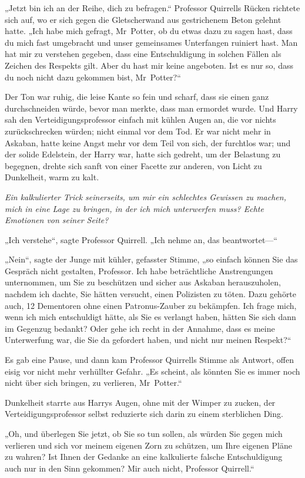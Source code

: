 {„Jetzt bin ich an der Reihe, dich zu befragen.“ Professor Quirrells Rücken richtete sich auf, wo er sich gegen die Gletscherwand aus gestrichenem Beton gelehnt hatte. „Ich habe mich gefragt, Mr~Potter, ob du etwas dazu zu sagen hast, dass du mich fast umgebracht und unser gemeinsames Unterfangen ruiniert hast. Man hat mir zu verstehen gegeben, dass eine Entschuldigung in solchen Fällen als Zeichen des Respekts gilt. Aber du hast mir keine angeboten. Ist es nur so, dass du noch nicht dazu gekommen bist, Mr~Potter?“

Der Ton war ruhig, die leise Kante so fein und scharf, dass sie einen ganz durchschneiden würde, bevor man merkte, dass man ermordet wurde. Und Harry sah den Verteidigungsprofessor einfach mit kühlen Augen an, die vor nichts zurückschrecken würden; nicht einmal vor dem Tod. Er war nicht mehr in Askaban, hatte keine Angst mehr vor dem Teil von sich, der furchtlos war; und der solide Edelstein, der Harry war, hatte sich gedreht, um der Belastung zu begegnen, drehte sich sanft von einer Facette zur anderen, von Licht zu Dunkelheit, warm zu kalt.

\emph{Ein kalkulierter Trick seinerseits, um mir ein schlechtes Gewissen zu machen, mich in eine Lage zu bringen, in der ich mich unterwerfen muss? Echte Emotionen von seiner Seite?}

„Ich verstehe“, sagte Professor Quirrell. „Ich nehme an, das beantwortet—“

„Nein“, sagte der Junge mit kühler, gefasster Stimme, „so einfach können Sie das Gespräch nicht gestalten, Professor. Ich habe beträchtliche Anstrengungen unternommen, um Sie zu beschützen und sicher aus Askaban herauszuholen, nachdem ich dachte, Sie hätten versucht, einen Polizisten zu töten. Dazu gehörte auch, 12 Dementoren ohne einen Patronus-Zauber zu bekämpfen. Ich frage mich, wenn ich mich entschuldigt hätte, als Sie es verlangt haben, hätten Sie sich dann im Gegenzug bedankt? Oder gehe ich recht in der Annahme, dass es meine Unterwerfung war, die Sie da gefordert haben, und nicht nur meinen Respekt?“

Es gab eine Pause, und dann kam Professor Quirrells Stimme als Antwort, offen eisig vor nicht mehr verhüllter Gefahr. „Es scheint, als könnten Sie es immer noch nicht über sich bringen, zu verlieren, Mr~Potter.“

Dunkelheit starrte aus Harrys Augen, ohne mit der Wimper zu zucken, der Verteidigungsprofessor selbst reduzierte sich darin zu einem sterblichen Ding.

„Oh, und überlegen Sie jetzt, ob Sie so tun sollen, als würden Sie gegen mich verlieren und sich vor meinem eigenen Zorn zu schützen, um Ihre eigenen Pläne zu wahren? Ist Ihnen der Gedanke an eine kalkulierte falsche Entschuldigung auch nur in den Sinn gekommen? Mir auch nicht, Professor Quirrell.“

}
